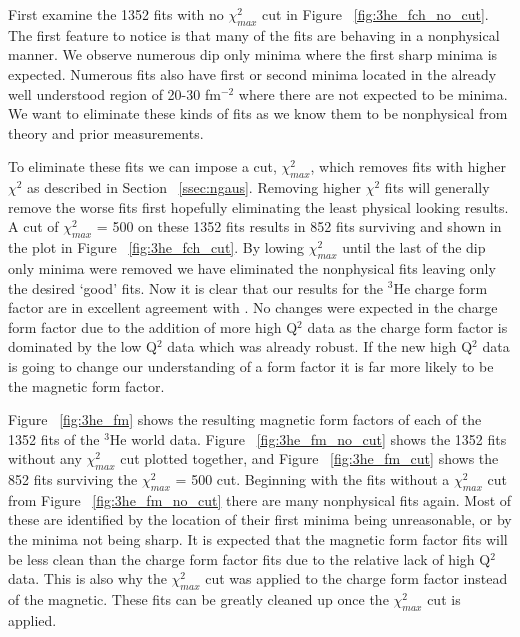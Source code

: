 First examine the 1352 fits with no $\chi^2_{max}$ cut in Figure ~\ref{fig:3he_fch_no_cut}. The first feature to notice is that many of the fits are behaving in a nonphysical manner. We observe numerous dip only minima where the first sharp minima is expected. Numerous fits also have first or second minima located in the already well understood region of 20-30 fm$^{-2}$ where there are not expected to be minima. We want to eliminate these kinds of fits as we know them to be nonphysical from theory and prior measurements. 

To eliminate these fits we can impose a cut, $\chi^2_{max}$, which removes fits with higher $\chi^2$ as described in Section ~\ref{ssec:ngaus}. Removing higher $\chi^2$ fits will generally remove the worse fits first hopefully eliminating the least physical looking results. A cut of $\chi^2_{max}$ = 500 on these 1352 fits results in 852 fits surviving and shown in the plot in Figure ~\ref{fig:3he_fch_cut}. By lowing $\chi^2_{max}$ until the last of the dip only minima were removed we have eliminated the nonphysical fits leaving only the desired `good' fits. Now it is clear that our results for the $^3$He charge form factor are in excellent agreement with \cite{Article:Amroun}. No changes were expected in the charge form factor due to the addition of more high Q$^2$ data as the charge form factor is dominated by the low Q$^2$ data which was already robust. If the new high Q$^2$ data is going to change our understanding of a form factor it is far more likely to be the magnetic form factor.

Figure ~\ref{fig:3he_fm} shows the resulting magnetic form factors of each of the 1352 fits of the $^3$He world data. Figure ~\ref{fig:3he_fm_no_cut} shows the 1352 fits without any $\chi^2_{max}$ cut plotted together, and Figure ~\ref{fig:3he_fm_cut} shows the 852 fits surviving the $\chi^2_{max}$ = 500 cut. Beginning with the fits without a $\chi^2_{max}$ cut from Figure ~\ref{fig:3he_fm_no_cut} there are many nonphysical fits again. Most of these are identified by the location of their first minima being unreasonable, or by the minima not being sharp. It is expected that the magnetic form factor fits will be less clean than the charge form factor fits due to the relative lack of high Q$^2$ data. This is also why the $\chi^2_{max}$ cut was applied to the charge form factor instead of the magnetic. These fits can be greatly cleaned up once the $\chi^2_{max}$ cut is applied.

